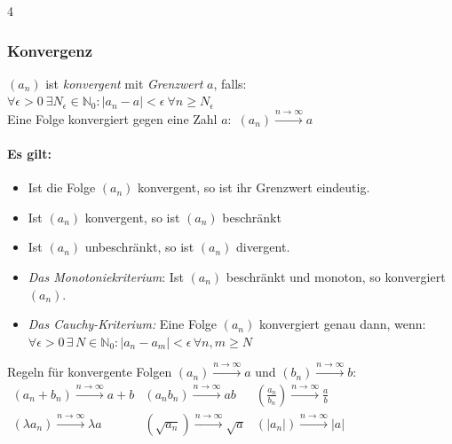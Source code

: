 \documentclass[6pt,a4paper]{scrartcl}
\newcommand{\abs}[1]{\ensuremath{\left\vert#1\right\vert}}
\begin{document}
\begin{multicols*}{4}
    \subsubsection{Konvergenz}
    $(a_n)$ ist \emph{konvergent} mit \emph{Grenzwert} $a$, falls: $\forall \epsilon > 0 \ \exists N_\epsilon  \in \mathbb N_0:  \abs{a_n -a} < \epsilon \ \forall n \ge N_\epsilon$\\
    Eine Folge konvergiert gegen eine Zahl $a$:\ $(a_n) \overset{n \rightarrow \infty}{\longrightarrow} a$
    \begin{sectionbox}
        \paragraph{Es gilt:}
        \begin{itemize}\itemsep0pt
            \item Ist die Folge $(a_n)$ konvergent, so ist ihr Grenzwert eindeutig.
            \item Ist $(a_n)$ konvergent, so ist $(a_n)$ beschränkt
            \item Ist $(a_n)$ unbeschränkt, so ist $(a_n)$ divergent.
            \item \emph{Das Monotoniekriterium}: Ist $(a_n)$ beschränkt und monoton, so konvergiert $(a_n)$.
            \item \emph{Das Cauchy-Kriterium:} Eine Folge $(a_n)$ konvergiert genau dann, wenn: \\ $\forall \epsilon >0 \, \exists \,  N \in \mathbb N_0: \abs{a_n - a_m} < \epsilon \, \forall n, m \ge N$
        \end{itemize}
    \end{sectionbox}
    Regeln für konvergente Folgen $(a_n) \overset{n \rightarrow \infty}{\longrightarrow} a$ und $(b_n) \overset{n \rightarrow \infty}{\longrightarrow} b$:\\
    $\begin{array}{lll}
            (a_n+b_n) \overset{n \rightarrow \infty}{\longrightarrow} a+b           & (a_n b_n) \overset{n \rightarrow \infty}{\longrightarrow} ab          & (\frac{a_n}{b_n}) \overset{n \rightarrow \infty}{\longrightarrow} \frac{a}{b} \\
            (\lambda a_n) \overset{n \rightarrow \infty}{\longrightarrow} \lambda a & (\sqrt{a_n}) \overset{n \rightarrow \infty}{\longrightarrow} \sqrt{a} & (|a_n|) \overset{n \rightarrow \infty}{\longrightarrow} |a|
        \end{array}$

\end{multicols*}
\end{document}
